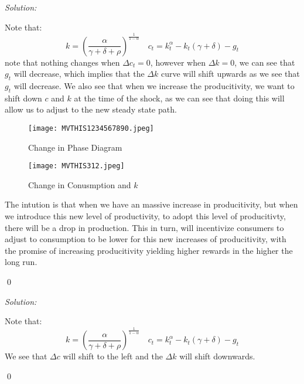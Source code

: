 \documentclass[12pt]{article}
\newcounter{subproblem}
\renewcommand{\thesubproblem}{\arabic{subproblem}} %
\newenvironment{subprob}[1][]{
  \refstepcounter{subproblem}
  \begin{trivlist}
  \item[\hskip \labelsep {\bfseries (\thesubproblem)}]
}{
  \end{trivlist}
}
\newenvironment{subsol}
    {\emph{Solution:}
    }
    {
    \qed
    }
\begin{document}
\begin{subsol}
    Note that:
    \[
        k =\left( \frac{\alpha}{\gamma + \delta + \rho} \right)^\frac{1}{1-\alpha} \quad  c_t = k_t^\alpha - k_t(\gamma + \delta) - g_t
    \]
    note that nothing changes when $\Delta c_t = 0$, however when $\Delta k  = 0$, we can see that $g_t$ will decrease, which implies that the $\Delta k$ curve will shift upwards as we see that $g_t$ will decrease. We also see that when we increase the producitivity, we want to shift down $c$ and $k$ at the time of the shock, as we can see that doing this will allow us to adjust to the new steady state path. 
    \begin{figure}[H]
        \centering
        \texttt{[image: MVTHIS1234567890.jpeg]}
        \caption{Change in Phase Diagram}
        \label{fig:enter-label12}
    \end{figure}
    \begin{figure}[H]
        \centering
        \texttt{[image: MVTHIS312.jpeg]}
        \caption{Change in Conusmption and $k$}
        \label{fig:enter1212-label}
    \end{figure}
    The intution is that when we have an massive increase in producitivity, but when we introduce this new level of productivity, to adopt this level of producitivty, there will be a drop in production. This in turn, will incentivize consumers to adjust to consumption to be lower for this new increases of producitivity, with the promise of increasing producitivity yielding higher rewards in the higher the long run. 
\end{subsol}
\begin{subprob}
    
\end{subprob}
\begin{subsol}
    Note that:
    \[
        k =\left( \frac{\alpha}{\gamma + \delta + \rho} \right)^\frac{1}{1-\alpha} \quad  c_t = k_t^\alpha - k_t(\gamma + \delta) - g_t
    \]
    We see that $\Delta c$ will shift to the left and the $\Delta k$ will shift downwards. 
\end{subsol}
\end{document}
